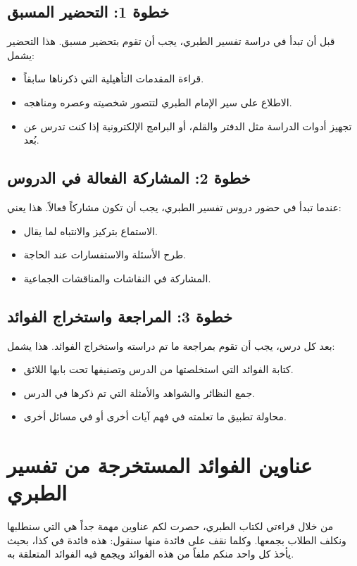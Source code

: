 \subsection*{خطوة 1: التحضير المسبق}
قبل أن تبدأ في دراسة تفسير الطبري، يجب أن تقوم بتحضير مسبق. هذا التحضير يشمل:
\begin{itemize}
    \item قراءة المقدمات التأهيلية التي ذكرناها سابقاً.
    \item الاطلاع على سير الإمام الطبري لتتصور شخصيته وعصره ومناهجه.
    \item تجهيز أدوات الدراسة مثل الدفتر والقلم، أو البرامج الإلكترونية إذا كنت تدرس عن بُعد.
\end{itemize}

\subsection*{خطوة 2: المشاركة الفعالة في الدروس}
عندما تبدأ في حضور دروس تفسير الطبري، يجب أن تكون مشاركاً فعالاً. هذا يعني:
\begin{itemize}
    \item الاستماع بتركيز والانتباه لما يقال.
    \item طرح الأسئلة والاستفسارات عند الحاجة.
    \item المشاركة في النقاشات والمناقشات الجماعية.
\end{itemize}

\subsection*{خطوة 3: المراجعة واستخراج الفوائد}
بعد كل درس، يجب أن تقوم بمراجعة ما تم دراسته واستخراج الفوائد. هذا يشمل:
\begin{itemize}
    \item كتابة الفوائد التي استخلصتها من الدرس وتصنيفها تحت بابها اللائق.
    \item جمع النظائر والشواهد والأمثلة التي تم ذكرها في الدرس.
    \item محاولة تطبيق ما تعلمته في فهم آيات أخرى أو في مسائل أخرى.
\end{itemize}

\separator

\section{عناوين الفوائد المستخرجة من تفسير الطبري}
من خلال قراءتي لكتاب الطبري، حصرت لكم عناوين مهمة جداً هي التي سنطلبها ونكلف الطلاب بجمعها. وكلما نقف على فائدة منها سنقول: هذه فائدة في كذا، بحيث يأخذ كل واحد منكم ملفاً من هذه الفوائد ويجمع فيه الفوائد المتعلقة به.

